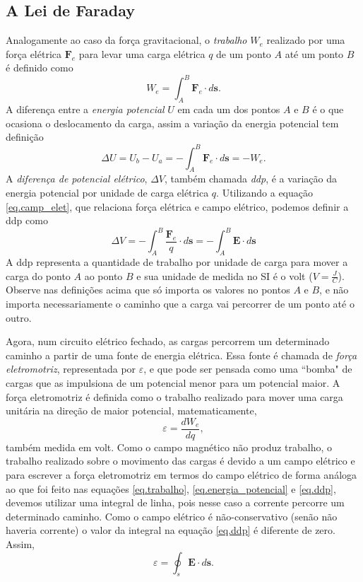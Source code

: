\subsection{A Lei de Faraday}
Analogamente ao caso da força gravitacional, o \textit{trabalho} $W_e$ realizado por uma força elétrica $\textbf{F}_e$ para levar uma carga elétrica $q$ de um ponto $A$ até um ponto $B$ é definido como
\begin{equation}\label{eq.trabalho}
W_e=\int_{A}^{B}\textbf{F}_e\cdot d\textbf{s}.
\end{equation}
A diferença entre a \textit{energia potencial} $U$ em cada um dos pontos $A$ e $B$ é o que ocasiona o deslocamento da carga, assim a variação da energia potencial tem definição
\begin{equation}\label{eq.energia_potencial}
\Delta U=U_b-U_a=-\int_{A}^{B}\textbf{F}_e\cdot d\textbf{s}=-W_e.
\end{equation}
A \textit{diferença de potencial elétrico}, $\Delta V$, também chamada \textit{ddp}, é a variação da energia potencial por unidade de carga elétrica $q$. Utilizando a equação \ref{eq.camp_elet}, que relaciona força elétrica e campo elétrico, podemos definir a ddp como
\begin{equation}\label{eq.ddp}
\Delta V=-\int_{A}^{B}\frac{\textbf{F}_e}{q}\cdot d\textbf{s}=-\int_{A}^{B}\textbf{E}\cdot d\textbf{s}
\end{equation}
A ddp representa a quantidade de trabalho por unidade de carga para mover a carga do ponto $A$ ao ponto $B$ e sua unidade de medida no SI é o volt ($V=\frac{J}{C}$). Observe nas definições acima que só importa os valores no pontos $A$ e $B$, e não importa necessariamente o caminho que a carga vai percorrer de um ponto até o outro. 

Agora, num circuito elétrico fechado, as cargas percorrem um determinado caminho a partir de uma fonte de energia elétrica. Essa fonte é chamada de \textit{força eletromotriz}, representada por $\varepsilon$, e que pode ser pensada como uma ``bomba" de cargas que as impulsiona de um potencial menor para um potencial maior. A força eletromotriz é definida como o trabalho realizado para mover uma carga unitária na direção de maior potencial, matematicamente,
\begin{equation*}
\varepsilon=\frac{dW_e}{dq}, 
\end{equation*}
também medida em volt. Como o campo magnético não produz trabalho, o trabalho realizado sobre o movimento das cargas é devido a um campo elétrico e para escrever a força eletromotriz em termos do campo elétrico de forma análoga ao que foi feito nas equações \ref{eq.trabalho}, \ref{eq.energia_potencial} e \ref{eq.ddp}, devemos utilizar uma integral de linha, pois nesse caso a corrente percorre um determinado caminho. Como o campo elétrico é não-conservativo (senão não haveria corrente) o valor da integral na equação \ref{eq.ddp} é diferente de zero. Assim,
\begin{equation}\label{eq.emf_E_nc}
\varepsilon=\oint_s\pmb{E}\cdot d\pmb{s}.
\end{equation}
 
